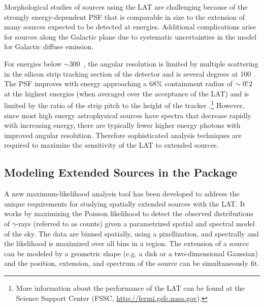 Morphological studies of sources using the LAT are challenging
because of the strongly energy-dependent PSF that is comparable in
size to the extension of many sources expected to be detected at
\gev energies.  Additional complications arise for sources along
the Galactic plane due to systematic uncertainties in the model for
Galactic diffuse emission.  

For energies below $\sim$300~\mev, the angular resolution is limited by
multiple scattering in the silicon strip tracking section
of the detector and is several degrees at 100 \mev.  The PSF improves
with energy approaching a 68\% containment radius of $\sim0\mbox{$.\!\!^\circ$}2$ at
the highest energies (when averaged over the acceptance of the LAT)
and is limited by the ratio of the strip pitch to the height of the tracker
\citep{atwood_2009a_large-telescope,abdo_2009a_on-orbit-calibration,ackermann_2012a_fermi-large}.\footnote{More
information about the performance of the LAT can be found at the \fermi
Science Support Center (FSSC, \url{http://fermi.gsfc.nasa.gov}).} However,
since most high energy astrophysical sources have spectra that decrease
rapidly with increasing energy, there are typically fewer higher
energy photons with improved angular resolution. Therefore sophisticated
analysis techniques are required to maximize the sensitivity of the LAT
to extended sources.

\subsection{Modeling Extended Sources in the \pointlike Package}

A new maximum-likelihood analysis tool has been developed to address the
unique requirements for studying spatially extended sources with the LAT.
It works by maximizing the Poisson 
likelihood to detect the observed distributions of $\gamma$-rays (referred to as counts)
given a parametrized spatial and spectral model of the sky.  
The data are binned spatially, using a \healpix pixellization, and spectrally 
\citep{gorski_2005_healpix:-framework} and the likelihood is maximized over all bins in
a region.
The extension of a source can be modeled by a geometric shape
(e.g. a disk or a two-dimensional Gaussian) and the position, extension,
and spectrum of the source can be simultaneously fit.

